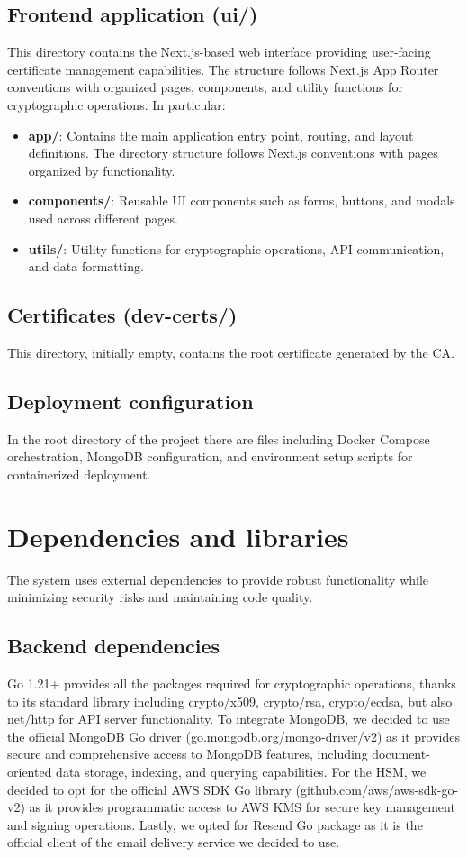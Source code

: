 \subsection{Frontend application (ui/)}
This directory contains the Next.js-based web interface 
providing user-facing certificate management capabilities. The structure follows 
Next.js App Router conventions with organized pages, components, and utility 
functions for cryptographic operations.
In particular:
\begin{itemize}
    \item \textbf{app/}: Contains the main application entry point, routing, and 
    layout definitions. The directory structure follows Next.js conventions with 
    pages organized by functionality.
    \item \textbf{components/}: Reusable UI components such as forms, buttons, 
    and modals used across different pages.
    \item \textbf{utils/}: Utility functions for cryptographic operations, API 
    communication, and data formatting.
\end{itemize}

\subsection{Certificates (dev-certs/)}
This directory, initially empty, contains the root certificate generated by the CA.

\subsection{Deployment configuration}
In the root directory of the project there are files including Docker Compose 
orchestration, MongoDB configuration, and environment setup scripts for 
containerized deployment.

\section{Dependencies and libraries}

The system uses external dependencies to provide robust functionality 
while minimizing security risks and maintaining code quality.

\subsection{Backend dependencies}
Go 1.21+ provides all the packages required for cryptographic operations, thanks to 
its standard library including crypto/x509, crypto/rsa, crypto/ecdsa, but also net/http 
for API server functionality.
To integrate MongoDB, we decided to use the official MongoDB Go driver (go.mongodb.org/mongo-driver/v2) 
as it provides secure and comprehensive access to MongoDB features, including 
document-oriented data storage, indexing, and querying capabilities.
For the HSM, we decided to opt for the official AWS SDK Go library (github.com/aws/aws-sdk-go-v2) 
as it provides programmatic access to AWS KMS for secure key management and signing 
operations.
Lastly, we opted for Resend Go package as it is the official client of the email delivery service
we decided to use.


